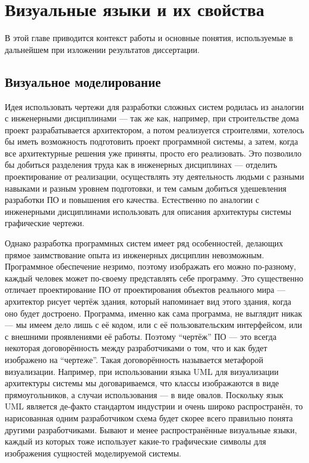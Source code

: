 \chapter{Визуальные языки и их свойства}

В этой главе приводится контекст работы и основные понятия, используемые в 
дальнейшем при изложении результатов диссертации. 

\section{Визуальное моделирование}
Идея использовать чертежи для разработки сложных систем родилась из аналогии с 
инженерными дисциплинами --- так же как, например, при строительстве дома проект 
разрабатывается архитектором, а потом реализуется строителями, хотелось бы иметь 
возможность подготовить проект программной системы, а затем, когда все 
архитектурные решения уже приняты, просто его реализовать. Это позволило бы 
добиться разделения труда как в инженерных дисциплинах --- отделить 
проектирование от реализации, осуществлять эту деятельность людьми с разными 
навыками и разным уровнем подготовки, и тем самым добиться удешевления разработки 
ПО и повышения его качества. Естественно по аналогии с инженерными дисциплинами 
использовать для описания архитектуры системы графические чертежи.

Однако разработка программных систем имеет ряд особенностей, делающих прямое 
заимствование опыта из инженерных дисциплин невозможным. Программное обеспечение 
незримо, поэтому изображать его можно по-разному, каждый человек может по-своему 
представлять себе программу. Это существенно отличает проектирование ПО от 
проектирования объектов реального мира --- архитектор рисует чертёж здания, 
который напоминает вид этого здания, когда оно будет достроено. Программа, 
именно как сама программа, не выглядит никак --- мы имеем дело лишь с её кодом, 
или с её пользовательским интерфейсом, или с внешними проявлениями её работы. 
Поэтому "`чертёж"' ПО --- это всегда некоторая договорённость между 
разработчиками о том, что и как будет изображено на "`чертеже"'. Такая договорённость называется 
метафорой визуализации. Например, при использовании 
языка UML для визуализации архитектуры системы мы договариваемся, что классы 
изображаются в виде прямоугольников, а случаи использования --- в виде овалов. 
Поскольку язык UML является де-факто стандартом индустрии и очень широко 
распространён, то нарисованная одним разработчиком схема будет скорее всего 
правильно понята другими разработчиками. Бывают и менее распространённые 
визуальные языки, каждый из которых тоже использует какие-то графические символы 
для изображения сущностей моделируемой системы.

